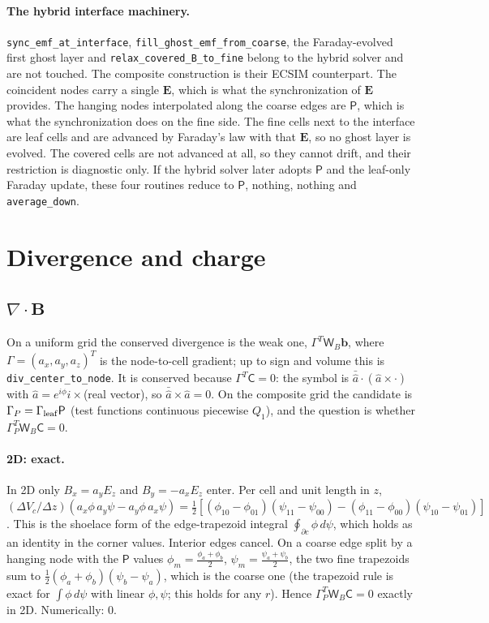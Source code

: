 \documentclass[a4paper,11pt]{article}
\newcommand{\code}[1]{\texttt{#1}}
\newcommand{\BB}{\mathbf{b}}
\newcommand{\Pm}{\mathsf{P}}
\newcommand{\Cm}{\mathsf{C}}
\newcommand{\Wb}{\mathsf{W}_B}
\begin{document}
\paragraph{The hybrid interface machinery.} \code{sync\_emf\_at\_interface},
\code{fill\_ghost\_emf\_from\_coarse}, the Faraday-evolved first ghost layer and
\code{relax\_covered\_B\_to\_fine} belong to the hybrid solver and are not touched. The
composite construction is their ECSIM counterpart. The coincident nodes carry a single
$\mathbf{E}$, which is what the synchronization of $\mathbf{E}$ provides. The hanging nodes
interpolated along the coarse edges are $\Pm$, which is what the synchronization does
on the fine side. The fine cells next to the interface are leaf cells and are advanced
by Faraday's law with that $\mathbf{E}$, so no ghost layer is evolved. The covered cells
are not advanced at all, so they cannot drift, and their restriction is diagnostic only.
If the hybrid solver later adopts $\Pm$ and the leaf-only Faraday update, these four
routines reduce to $\Pm$, nothing, nothing and \code{average\_down}.

\section{Divergence and charge}\label{sec:div}

\subsection{$\nabla\cdot\mathbf{B}$}
On a uniform grid the conserved divergence is the weak one, $\Gamma^T\Wb\BB$, where
$\Gamma=(a_x,a_y,a_z)^T$ is the node-to-cell gradient; up to sign and volume this is
\code{div\_center\_to\_node}. It is conserved because $\Gamma^T\Cm=0$: the symbol is
$\bar{\hat a}\cdot(\hat a\times\cdot)$ with $\hat a=e^{i\phi}i\times$(real vector), so
$\bar{\hat a}\times\hat a=0$. On the composite grid the candidate is $\Gamma_P=\Gamma_{\rm leaf}\Pm$
(test functions continuous piecewise $Q_1$), and the question is whether $\Gamma_P^T\Wb\Cm=0$.

\paragraph{2D: exact.} In 2D only $B_x=a_yE_z$ and $B_y=-a_xE_z$ enter. Per cell and unit length in $z$,
$(\Delta V_c/\Delta z)(a_x\phi\,a_y\psi-a_y\phi\,a_x\psi)=\tfrac12[(\phi_{10}-\phi_{01})(\psi_{11}-\psi_{00})
-(\phi_{11}-\phi_{00})(\psi_{10}-\psi_{01})]$. This is the shoelace form of the edge-trapezoid
integral $\oint_{\partial c}\phi\,d\psi$, which holds as an identity in the corner values.
Interior edges cancel. On a coarse edge split by a hanging node with the
$\Pm$ values $\phi_m=\frac{\phi_a+\phi_b}2$, $\psi_m=\frac{\psi_a+\psi_b}2$, the two fine
trapezoids sum to $\frac12(\phi_a+\phi_b)(\psi_b-\psi_a)$, which is the coarse one (the trapezoid
rule is exact for $\int\phi\,d\psi$ with linear $\phi,\psi$; this holds for any $r$). Hence
$\Gamma_P^T\Wb\Cm=0$ exactly in 2D. Numerically: $0$.
\end{document}
